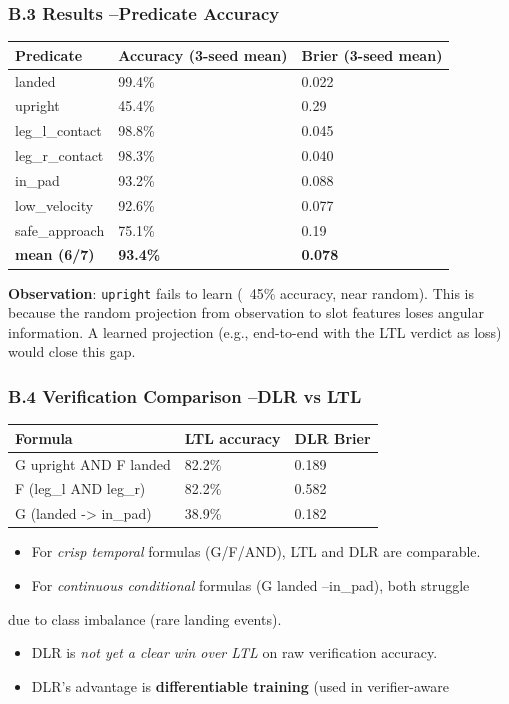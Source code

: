 \documentclass[11pt]{article}
\begin{document}
\subsubsection{B.3 Results --Predicate Accuracy}

\begin{tabular}{lll}
Predicate & Accuracy (3-seed mean) & Brier (3-seed mean) \\
\hline
landed & 99.4\% & 0.022 \\
upright & 45.4\% & 0.29 \\
leg\_l\_contact & 98.8\% & 0.045 \\
leg\_r\_contact & 98.3\% & 0.040 \\
in\_pad & 93.2\% & 0.088 \\
low\_velocity & 92.6\% & 0.077 \\
safe\_approach & 75.1\% & 0.19 \\
\textbf{mean (6/7)} & \textbf{93.4\%} & \textbf{0.078} \\
\end{tabular}


\textbf{Observation}: \texttt{upright} fails to learn (~45\% accuracy, near random).
This is because the random projection from observation to slot features
loses angular information. A learned projection (e.g., end-to-end with the
LTL verdict as loss) would close this gap.

\subsubsection{B.4 Verification Comparison --DLR vs LTL}

\begin{tabular}{lll}
Formula & LTL accuracy & DLR Brier \\
\hline
G upright AND F landed & 82.2\% & 0.189 \\
F (leg\_l AND leg\_r) & 82.2\% & 0.582 \\
G (landed -> in\_pad) & 38.9\% & 0.182 \\
\end{tabular}


\begin{itemize}
  \item For \textit{crisp temporal} formulas (G/F/AND), LTL and DLR are comparable.
  \item For \textit{continuous conditional} formulas (G landed --in\_pad), both struggle
\end{itemize}

  due to class imbalance (rare landing events).
\begin{itemize}
  \item DLR is \textit{not yet a clear win over LTL} on raw verification accuracy.
  \item DLR's advantage is \textbf{differentiable training} (used in verifier-aware
\end{itemize}
\end{document}
